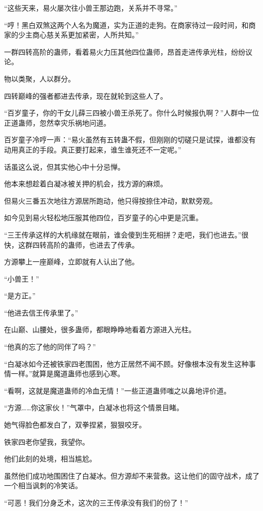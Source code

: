 \begin{this_body}
“这些天来，易火屡次往小兽王那边跑，关系并不寻常。”

“哼！黑白双煞这两个人名为魔道，实为正道的走狗。在商家待过一段时间，和商家的少主商心慈关系更加紧密，人所共知。”

一群四转高阶的蛊师，看着易火力压其他四位蛊师，昂首走进传承光柱，纷纷议论。

物以类聚，人以群分。

四转巅峰的强者都进去传承，现在就轮到这些人了。

“百岁童子，你的干女儿薛三四被小兽王杀死了。你什么时候报仇啊？”人群中一位正道蛊师，忽然幸灾乐祸地问道。

百岁童子冷哼一声：“易火虽然有五转蛊不假，但刚刚的切磋只是试探，谁都没有动用真正的手段。真正要打起来，谁生谁死还不一定呢。”

话虽这么说，但其实他心中十分忌惮。

他本来想趁着白凝冰被关押的机会，找方源的麻烦。

但易火三番五次地往方源居所跑动，他只得按捺住冲动，默默旁观。

如今见到易火轻松地压服其他四位，百岁童子的心中更是沉重。

“三王传承这样的大机缘就在眼前，谁会傻到生死相拼？走吧，我们也进去。”很快，这群四转高阶的蛊师，也进去了传承。

方源攀上一座巅峰，立即就有人认出了他。

“小兽王！”

“是方正。”

“他进去信王传承里了。”

在山巅、山腰处，很多蛊师，都眼睁睁地看着方源进入光柱。

“他真的忘了他的同伴了吗？”

“白凝冰如今还被铁家四老围困，他方正居然不闻不顾。好像根本没有发生这种事情一样。”就算是魔道蛊师也感到心寒。

“看啊，这就是魔道蛊师的冷血无情！”一些正道蛊师嗤之以鼻地评价道。

“方源……你这家伙！”气罩中，白凝冰也将这个情景目睹。

她气得脸色都发白了，双拳捏紧，狠狠咬牙。

铁家四老你望我，我望你。

他们此刻的处境，相当尴尬。

虽然他们成功地围困住了白凝冰。但方源却不来营救。这让他们的固守战术，成了一个相当讽刺的冷笑话。

“可恶！我们分身乏术，这次的三王传承没有我们的份了！”


\end{this_body}
